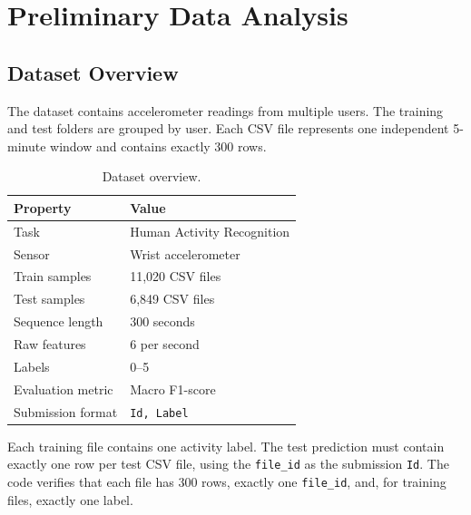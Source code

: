 \documentclass[conference]{IEEEtran}
\begin{document}
\section{Preliminary Data Analysis}
\subsection{Dataset Overview}
The dataset contains accelerometer readings from multiple users. The training and test folders are grouped by user. Each CSV file represents one independent 5-minute window and contains exactly 300 rows.
\begin{table}[!t]
\centering
\caption{Dataset overview.}
\label{tab:dataset}
\begin{tabular}{ll}
\toprule
Property & Value \\
\midrule
Task & Human Activity Recognition \\
Sensor & Wrist accelerometer \\
Train samples & 11,020 CSV files \\
Test samples & 6,849 CSV files \\
Sequence length & 300 seconds \\
Raw features & 6 per second \\
Labels & 0--5 \\
Evaluation metric & Macro F1-score \\
Submission format & \texttt{Id, Label} \\
\bottomrule
\end{tabular}
\end{table}
Each training file contains one activity label. The test prediction must contain exactly one row per test CSV file, using the \texttt{file\_id} as the submission \texttt{Id}. The code verifies that each file has 300 rows, exactly one \texttt{file\_id}, and, for training files, exactly one label.
\end{document}
